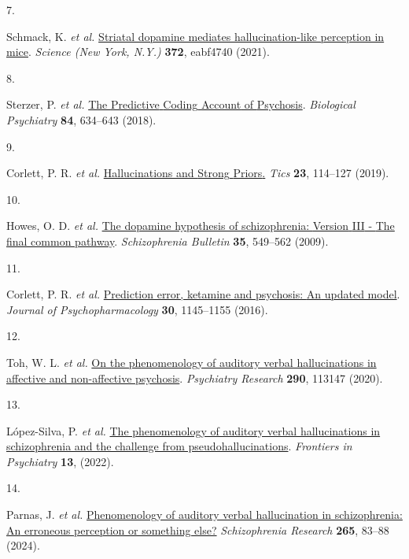 \documentclass[
]{article}
\newlength{\cslhangindent}
\newlength{\csllabelwidth}
\newlength{\cslentryspacingunit} %
\newenvironment{CSLReferences}[2] %
 {%
  \setlength{\parindent}{0pt}
  \ifodd #1
  \let\oldpar\par
  \def\par{\hangindent=\cslhangindent\oldpar}
  \fi
  \setlength{\parskip}{#2\cslentryspacingunit}
 }%
 {}
\newcommand{\CSLLeftMargin}[1]{\parbox[t]{\csllabelwidth}{#1}}
\newcommand{\CSLRightInline}[1]{\parbox[t]{\linewidth - \csllabelwidth}{#1}\break}
\begin{document}
\begin{CSLReferences}{0}{0}
\leavevmode{}%
\CSLLeftMargin{7. }%
\CSLRightInline{Schmack, K. \emph{et al.}
\href{https://doi.org/10.1126/science.abf4740}{Striatal dopamine
mediates hallucination-like perception in mice}. \emph{Science (New
York, N.Y.)} \textbf{372}, eabf4740 (2021).}

\leavevmode{}%
\CSLLeftMargin{8. }%
\CSLRightInline{Sterzer, P. \emph{et al.}
\href{https://doi.org/10.1016/j.biopsych.2018.05.015}{The {Predictive}
{Coding} {Account} of {Psychosis}}. \emph{Biological Psychiatry}
\textbf{84}, 634--643 (2018).}

\leavevmode{}%
\CSLLeftMargin{9. }%
\CSLRightInline{Corlett, P. R. \emph{et al.}
\href{https://doi.org/10.1016/j.tics.2018.12.001}{Hallucinations and
{Strong} {Priors}.} \emph{Tics} \textbf{23}, 114--127 (2019).}

\leavevmode{}%
\CSLLeftMargin{10. }%
\CSLRightInline{Howes, O. D. \emph{et al.}
\href{https://doi.org/10.1093/schbul/sbp006}{The dopamine hypothesis of
schizophrenia: {Version} {III} - {The} final common pathway}.
\emph{Schizophrenia Bulletin} \textbf{35}, 549--562 (2009).}

\leavevmode{}%
\CSLLeftMargin{11. }%
\CSLRightInline{Corlett, P. R. \emph{et al.}
\href{https://doi.org/10.1177/0269881116650087}{Prediction error,
ketamine and psychosis: {An} updated model}. \emph{Journal of
Psychopharmacology} \textbf{30}, 1145--1155 (2016).}

\leavevmode{}%
\CSLLeftMargin{12. }%
\CSLRightInline{Toh, W. L. \emph{et al.}
\href{https://doi.org/10.1016/j.psychres.2020.113147}{On the
phenomenology of auditory verbal hallucinations in affective and
non-affective psychosis}. \emph{Psychiatry Research} \textbf{290},
113147 (2020).}

\leavevmode{}%
\CSLLeftMargin{13. }%
\CSLRightInline{López-Silva, P. \emph{et al.}
\href{https://doi.org/10.3389/fpsyt.2022.826654}{The phenomenology of
auditory verbal hallucinations in schizophrenia and the challenge from
pseudohallucinations}. \emph{Frontiers in Psychiatry} \textbf{13},
(2022).}

\leavevmode{}%
\CSLLeftMargin{14. }%
\CSLRightInline{Parnas, J. \emph{et al.}
\href{https://doi.org/10.1016/j.schres.2023.03.045}{Phenomenology of
auditory verbal hallucination in schizophrenia: {An} erroneous
perception or something else?} \emph{Schizophrenia Research}
\textbf{265}, 83--88 (2024).}


\end{CSLReferences}
\end{document}

